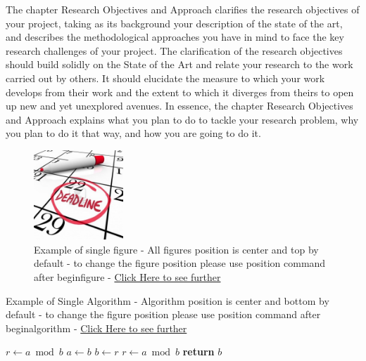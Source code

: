 The chapter Research Objectives and Approach clarifies the research objectives of your project, taking as its background your description of the state of the art, and describes the methodological approaches you have in mind to face the key research challenges of your project. The clarification of the research objectives should build solidly on the State of the Art and relate your research to the work carried out by others. It should elucidate the measure to which your work develops from their work and the extent to which it diverges from theirs to open up new and yet unexplored avenues. In essence, the chapter Research Objectives and Approach explains what you plan to do to tackle your research problem, why you plan to do it that way, and how you are going to do it.


\begin{figure}[b]

  \includegraphics[width=0.3\textwidth]{figures/example_1.jpg}
  \caption{\label{fig_1}Example of single figure - All figures position is center and top by default - to change the figure position please use position command after begin{figure} - \href{ https://www.overleaf.com/learn/latex/Positioning_of_Figures}{Click Here to see further}}
  
\end{figure}


\begin{algorithm}
  \caption{\label{alg_1}Example of Single Algorithm - Algorithm position is center and bottom by default - to change the figure position please use position command after begin{algorithm} - \href{https://www.overleaf.com/learn/latex/algorithms}{Click Here to see further}}
  
  \begin{algorithmic}[1]
    
    \State $r\gets a\bmod b$
    \State $a\gets b$
    \State $b\gets r$
    \State $r\gets a\bmod b$
    \EndWhile\label{euclidendwhile}
    \State \textbf{return} $b$
    \EndProcedure
  
  \end{algorithmic}

\end{algorithm}


